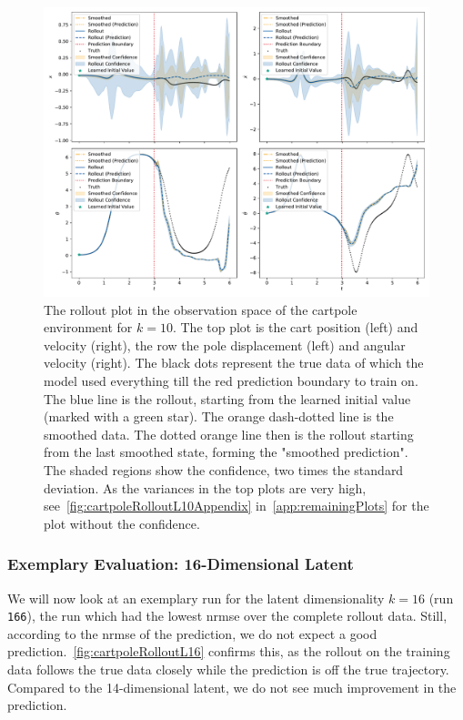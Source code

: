 			\begin{figure}
				\centering
				\includegraphics[width=\linewidth]{figures/results/cartpole-gym/run-latent-dim-10/rollout-observations-N0.pdf}
				\caption{The rollout plot in the observation space of the cartpole environment for \(k = 10\). The top plot is the cart position (left) and velocity (right), the row the pole displacement (left) and angular velocity (right). The black dots represent the true data of which the model used everything till the red prediction boundary to train on. The blue line is the rollout, starting from the learned initial value (marked with a green star). The orange dash-dotted line is the smoothed data. The dotted orange line then is the rollout starting from the last smoothed state, forming the "smoothed prediction". The shaded regions show the confidence, \ie two times the standard deviation. As the variances in the top plots are very high, see~\autoref{fig:cartpoleRolloutL10Appendix} in~\autoref{app:remainingPlots} for the plot without the confidence.}
				\label{fig:cartpoleRolloutL10}
			\end{figure}

		\subsubsection{Exemplary Evaluation: 16-Dimensional Latent}
			\label{subsubsec:cartpoleL16}

			We will now look at an exemplary run for the latent dimensionality \( k = 16 \) (run \texttt{166}), the run which had the lowest \ac{nrmse} over the complete rollout data. Still, according to the \ac{nrmse} of the prediction, we do not expect a good prediction.~\autoref{fig:cartpoleRolloutL16} confirms this, as the rollout on the training data follows the true data closely while the prediction is off the true trajectory. Compared to the 14-dimensional latent, we do not see much improvement in the prediction.

